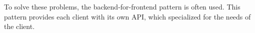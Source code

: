 \documentclass[MSE,Master,english]{twbook}%
\begin{document}







\fi

To solve these problems, the backend-for-frontend pattern is often used. This pattern provides each client with its own API, which specialized for the needs of the client. \cite{book:2018:richardson:microservices-patterns}
\end{document}
